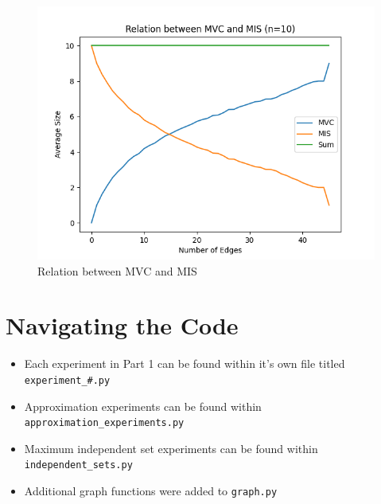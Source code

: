 \documentclass[titlepage]{article}
\begin{document}
\begin{figure}[H]
    \centering
    \includegraphics[width=0.8\linewidth]{mvc_mis.png}
    \caption{Relation between MVC and MIS}
    \label{fig:mvc_mis}
\end{figure}

\appendix
\section{Navigating the Code}

\begin{itemize}
    \item Each experiment in Part 1 can be found within it's own file titled \verb|experiment_#.py|
    \item Approximation experiments can be found within \verb|approximation_experiments.py|
    \item Maximum independent set experiments can be found within \verb|independent_sets.py|
    \item Additional graph functions were added to \verb|graph.py|
\end{itemize}
\end{document}
